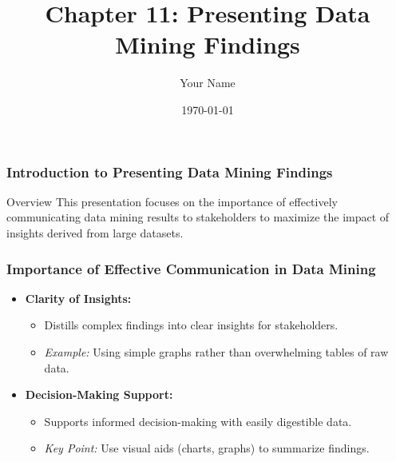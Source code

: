 \documentclass{beamer}
\title{Chapter 11: Presenting Data Mining Findings}
\author{Your Name}
\institute{Your Institution}
\date{\today}
\begin{document}
\frame{\titlepage}

\begin{frame}[fragile]
    \frametitle{Introduction to Presenting Data Mining Findings}
    \begin{block}{Overview}
        This presentation focuses on the importance of effectively communicating data mining results to stakeholders to maximize the impact of insights derived from large datasets.
    \end{block}
\end{frame}

\begin{frame}[fragile]
    \frametitle{Importance of Effective Communication in Data Mining}
    \begin{itemize}
        \item \textbf{Clarity of Insights:}
        \begin{itemize}
            \item Distills complex findings into clear insights for stakeholders.
            \item \textit{Example:} Using simple graphs rather than overwhelming tables of raw data.
        \end{itemize}
        
        \item \textbf{Decision-Making Support:}
        \begin{itemize}
            \item Supports informed decision-making with easily digestible data.
            \item \textit{Key Point:} Use visual aids (charts, graphs) to summarize findings.
        \end{itemize}
    \end{itemize}
\end{frame}
\end{document}
